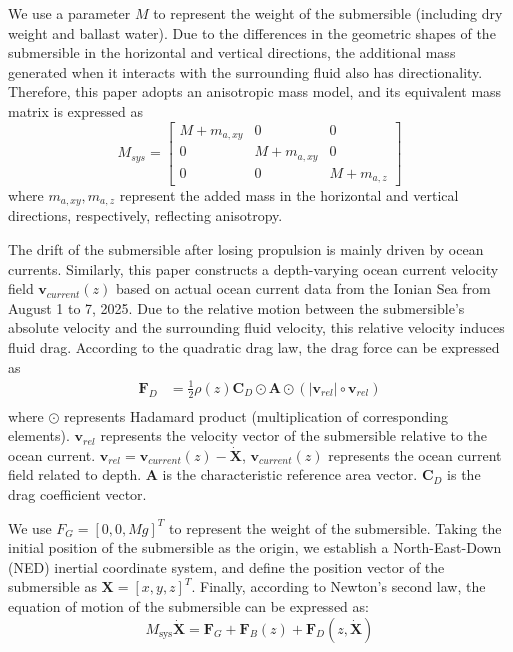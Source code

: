 \documentclass{mcmthesis}
\begin{document}
We use a parameter $M$ to represent the weight of the submersible (including dry weight and ballast water).
Due to the differences in the geometric shapes of the submersible in the horizontal and vertical directions,
the additional mass generated when it interacts with the surrounding fluid also has directionality.
Therefore, this paper adopts an anisotropic mass model, and its equivalent mass matrix is expressed as
\begin{equation}
  M_{sys} = \left[
  \begin{matrix}
    M + m_{a,xy} & 0 & 0 \\
    0 & M + m_{a,xy} & 0 \\
    0 & 0 & M + m_{a,z}
  \end{matrix}
  \right]
\end{equation}
where $m_{a,xy},m_{a,z}$ represent the added mass in the horizontal and vertical directions, respectively, reflecting anisotropy.

The drift of the submersible after losing propulsion is mainly driven by ocean currents.
Similarly, this paper constructs a depth-varying ocean current velocity field $\bm{v}_{current}(z)$ based on actual ocean current data from the Ionian Sea from August 1 to 7, 2025.
Due to the relative motion between the submersible's absolute velocity and the surrounding fluid velocity,
this relative velocity induces fluid drag.
According to the quadratic drag law, the drag force can be expressed as
\begin{equation}
  \begin{matrix}\bm{F}_D&=\frac{1}{2}\rho(z)\mathbf{C}_D\odot\mathbf{A}\odot(|\mathbf{v}_{rel}|\circ\mathbf{v}_{rel})\\\end{matrix}
\end{equation}
where
$\odot$ represents Hadamard product (multiplication of corresponding elements).
$\mathbf{v}_{rel}$ represents the velocity vector of the submersible relative to the ocean current. $\mathbf{v}_{rel}=\bm{v}_{current}(z)-\dot{\bm{X}}$,
$\bm{v}_{current}(z)$ represents the ocean current field related to depth.
$\mathbf{A}$ is the characteristic reference area vector.
$\mathbf{C}_D$ is the drag coefficient vector.

We use $F_G=[0,0,Mg]^T$ to represent the weight of the submersible. Taking the initial position of the submersible as the origin, we establish a North-East-Down (NED) inertial coordinate system,
and define the position vector of the submersible as $\bm{X}=[x,y,z]^T$.
Finally, according to Newton's second law, the equation of motion of the submersible can be expressed as:
\begin{equation}
M_{\mathrm{sys}}\dot{\bm{X}} = \bm{F}_{G} + \bm{F}_{B}(z) + \bm{F}_{D}({z},\dot{\bm{X}}) 
\end{equation}
\end{document}
